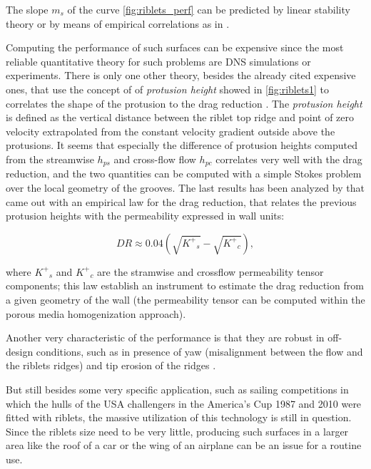 The slope $m_s$ of the curve \ref{fig:riblets_perf} can be predicted by linear stability theory or by means of empirical correlations as in \citet{garcia2011hydrodynamic}.

Computing the performance of such surfaces can be expensive since the most reliable quantitative theory for such problems are DNS simulations or experiments.
There is only one other theory, besides the already cited expensive ones, that use the concept of of \textit{protusion height} showed in \ref{fig:riblets1} to correlates the shape of the protusion to the drag reduction \citet{luchini1991resistance}.
The \textit{protusion height} is defined as the vertical distance between the riblet top ridge and point of zero velocity extrapolated from the constant velocity gradient outside above the protusions.
It seems that especially the difference of protusion heights computed from the streamwise $h_{ps}$ and cross-flow flow $h_{pc}$ correlates very well with the drag reduction, and the two quantities can be computed with a simple Stokes problem over the local geometry of the grooves.
The last results has been analyzed by \citet{segura2017permeable} that came out with an empirical law for the drag reduction, that relates the previous protusion heights with the permeability expressed in wall units:

\begin{equation}
DR \approx 0.04\left( \sqrt{{K^+}_s} - \sqrt{{K^+}_c} \right),
\label{eq:max_dr}
\end{equation}

where ${K^+}_s$ and ${K^+}_c$ are the stramwise and crossflow permeability tensor components; this law establish an instrument to estimate the drag reduction from a given geometry of the wall (the permeability tensor can be computed within the porous media homogenization approach).

Another very characteristic of the performance is that they are robust in off-design conditions, such as in presence of yaw (misalignment between the flow and the riblets ridges) and tip erosion of the ridges \citet{garcia2011drag}.

But still besides some very specific application, such as  sailing competitions in which the hulls of the USA challengers in the America’s Cup 1987 and 2010 were fitted with riblets, the massive utilization of this technology is still in question.
Since the riblets size need to be very little, producing such surfaces in a larger area like the roof of a car or the wing of an airplane can be an issue for a routine use.

